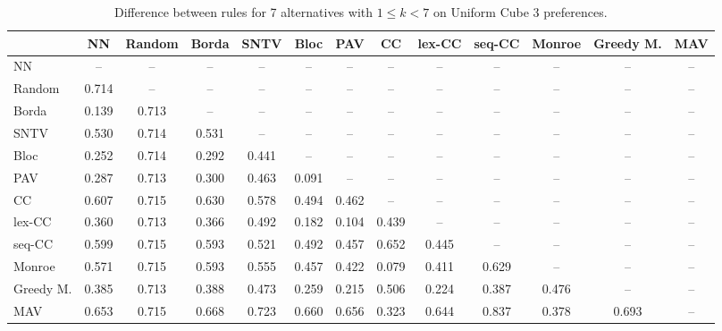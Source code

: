 
\begin{table*}[h!]
\centering
\begin{tabular}{lcccccccccccc}
\toprule
 & NN & Random & Borda & SNTV & Bloc & PAV & CC & lex-CC & seq-CC & Monroe & Greedy M. & MAV \\
\midrule
NN & -- & -- & -- & -- & -- & -- & -- & -- & -- & -- & -- & -- \\
Random & 0.714 & -- & -- & -- & -- & -- & -- & -- & -- & -- & -- & -- \\
Borda & 0.139 & 0.713 & -- & -- & -- & -- & -- & -- & -- & -- & -- & -- \\
SNTV & 0.530 & 0.714 & 0.531 & -- & -- & -- & -- & -- & -- & -- & -- & -- \\
Bloc & 0.252 & 0.714 & 0.292 & 0.441 & -- & -- & -- & -- & -- & -- & -- & -- \\
PAV & 0.287 & 0.713 & 0.300 & 0.463 & 0.091 & -- & -- & -- & -- & -- & -- & -- \\
CC & 0.607 & 0.715 & 0.630 & 0.578 & 0.494 & 0.462 & -- & -- & -- & -- & -- & -- \\
lex-CC & 0.360 & 0.713 & 0.366 & 0.492 & 0.182 & 0.104 & 0.439 & -- & -- & -- & -- & -- \\
seq-CC & 0.599 & 0.715 & 0.593 & 0.521 & 0.492 & 0.457 & 0.652 & 0.445 & -- & -- & -- & -- \\
Monroe & 0.571 & 0.715 & 0.593 & 0.555 & 0.457 & 0.422 & 0.079 & 0.411 & 0.629 & -- & -- & -- \\
Greedy M. & 0.385 & 0.713 & 0.388 & 0.473 & 0.259 & 0.215 & 0.506 & 0.224 & 0.387 & 0.476 & -- & -- \\
MAV & 0.653 & 0.715 & 0.668 & 0.723 & 0.660 & 0.656 & 0.323 & 0.644 & 0.837 & 0.378 & 0.693 & -- \\
\bottomrule
\end{tabular}

\caption{Difference between rules for 7 alternatives with $1 \leq k < 7$ on Uniform Cube 3 preferences.}
\end{table*}
